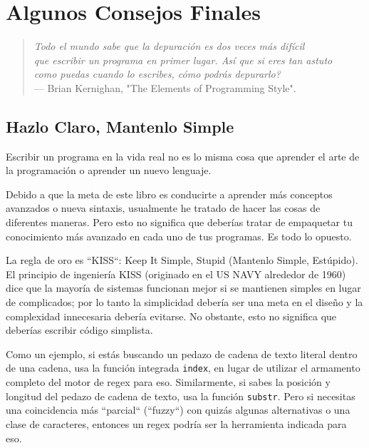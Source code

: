\chapter{Algunos Consejos Finales}

\begin{quote}
\raggedleft 
\emph{Todo el mundo sabe que la depuración es dos veces más difícil\\
que escribir un programa en primer lugar. Así que si eres tan astuto\\
como puedas cuando lo escribes, cómo podrás depurarlo? }\\
--- Brian Kernighan, "The Elements of Programming Style".	
\end{quote}

\section{Hazlo Claro, Mantenlo Simple}

Escribir un programa en la vida real no es lo misma cosa que 
aprender el arte de la programación o aprender un nuevo lenguaje.

Debido a que la meta de este libro es conducirte a aprender
más conceptos avanzados o nueva sintaxis, usualmente he tratado
de hacer las cosas de diferentes maneras. Pero esto no significa 
que deberías tratar de empaquetar tu conocimiento más avanzado
en cada uno de tus programas. Es todo lo opuesto.

La regla de oro es ``KISS``: Keep It Simple, Stupid (Mantenlo Simple, Estúpido).
El principio de ingeniería KISS (originado en el US NAVY alrededor de 1960)
dice que la mayoría de sistemas funcionan mejor si se mantienen
simples en lugar de complicados; por lo tanto la simplicidad
debería ser una meta en el diseño y la complexidad innecesaria 
debería evitarse. No obstante, esto no significa que deberías escribir 
código simplista.

Como un ejemplo, si estás buscando un pedazo de cadena de texto
literal dentro de una cadena, usa la función integrada {\tt index},
en lugar de utilizar el armamento completo del motor de regex para eso.
Similarmente, si sabes la posición y longitud del pedazo de 
cadena de texto, usa la función {\tt substr}. Pero si necesitas una
coincidencia más ``parcial`` (``fuzzy``) con quizás algunas alternativas o 
una clase de caracteres, entonces un regex podría ser la herramienta
indicada para eso.

